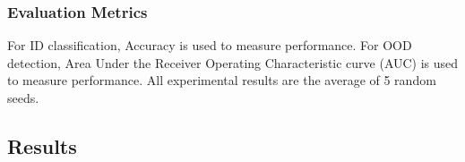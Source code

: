 \subsubsection{Evaluation Metrics}
For ID classification, Accuracy is used to measure performance. For OOD detection, Area Under the Receiver Operating Characteristic curve (AUC) is used to measure performance. All experimental results are the average of 5 random seeds.

\subsection{Results}
\label{sec:propwork-mod-results}


